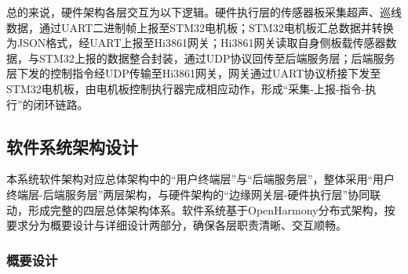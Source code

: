 \documentclass{article}
\begin{document}
总的来说，硬件架构各层交互为以下逻辑。硬件执行层的传感器板采集超声、巡线数据，通过UART二进制帧上报至STM32电机板；STM32电机板汇总数据并转换为JSON格式，经UART上报至Hi3861网关；Hi3861网关读取自身侧板载传感器数据，与STM32上报的数据整合封装，通过UDP协议回传至后端服务层；后端服务层下发的控制指令经UDP传输至Hi3861网关，网关通过UART协议桥接下发至STM32电机板，由电机板控制执行器完成相应动作，形成“采集-上报-指令-执行”的闭环链路。


\subsection{软件系统架构设计}

本系统软件架构对应总体架构中的“用户终端层”与“后端服务层”，整体采用“用户终端层-后端服务层”两层架构，与硬件架构的“边缘网关层-硬件执行层”协同联动，形成完整的四层总体架构体系。软件系统基于OpenHarmony分布式架构，按要求分为概要设计与详细设计两部分，确保各层职责清晰、交互顺畅。

\subsubsection{概要设计}
\end{document}

